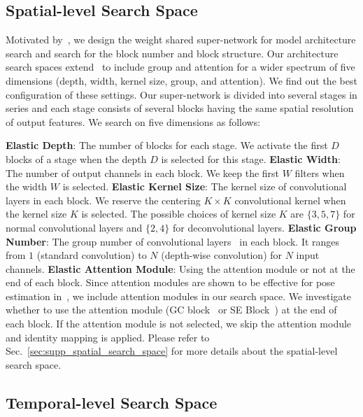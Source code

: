 \documentclass[final]{cvpr}
\begin{document}
\subsection{Spatial-level Search Space}
 \label{sec:spatial_level}
Motivated by~\cite{cai2020once,yu2020bignas}, we design the weight shared super-network for model architecture search and search for the block number and block structure. Our architecture search spaces extend~\cite{cai2020once,yu2020bignas} to include group and attention for a wider spectrum of five dimensions (depth, width, kernel size, group, and attention). We find out the best configuration of these settings. Our super-network is divided into several stages in series and each stage consists of several blocks having the same spatial resolution of output features. We search on five dimensions as follows:

\textbf{Elastic Depth}: The number of blocks for each stage. We activate the first $D$ blocks of a stage when the depth $D$ is selected for this stage. 
\textbf{Elastic Width}: The number of output channels in each block. We keep the first $W$ filters when the width $W$ is selected.
\textbf{Elastic Kernel Size}: The kernel size of convolutional layers in each block. We reserve the centering $K \times K$ convolutional kernel when the kernel size $K$ is selected. The possible choices of kernel size $K$ are $\{3, 5, 7\}$ for normal convolutional layers and $\{2, 4\}$ for deconvolutional layers.
\textbf{Elastic Group Number}: The group number of convolutional layers~\cite{krizhevsky2017imagenet} in each block. It ranges from $1$ (standard convolution) to $N$ (depth-wise convolution) for $N$ input channels.
\textbf{Elastic Attention Module}:
Using the attention module or not at the end of each block. Since attention modules are shown to be effective for pose estimation in~\cite{chu2017multi,su2019multi},
we include attention modules in our search space. We investigate whether to use the attention module (\eg GC block~\cite{cao2019gcnet} or SE Block~\cite{hu2018squeeze}) at the end of each block. If the attention module is not selected, we skip the attention module and identity mapping is applied. Please refer to Sec.~\ref{sec:supp_spatial_search_space} for more details about the spatial-level search space.

\subsection{Temporal-level Search Space}
\label{sec:temporal_level}
\end{document}
